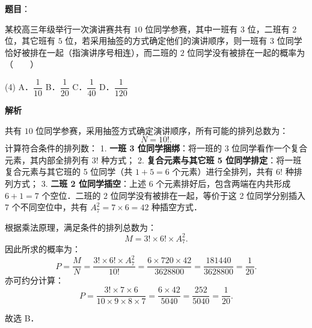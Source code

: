 \begin{answer}

\textbf{题目}：

某校高三年级举行一次演讲赛共有 $10$ 位同学参赛，其中一班有 $3$ 位，二班有 $2$ 位，其它班有 $5$ 位，若采用抽签的方式确定他们的演讲顺序，则一班有 $3$ 位同学恰好被排在一起（指演讲序号相连），而二班的 $2$ 位同学没有被排在一起的概率为\mbox{（　　）}

\begin{gkopts}(4)
\task A．$\dfrac{1}{10}$
\task B．$\dfrac{1}{20}$
\task C．$\dfrac{1}{40}$
\task D．$\dfrac{1}{120}$
\end{gkopts}

\textbf{解析}

共有 $10$ 位同学参赛，采用抽签方式确定演讲顺序，所有可能的排列总数为：
\nopagebreak[4]
\[
N = 10!.
\]
计算符合条件的排列数：
1. \textbf{一班 3 位同学捆绑}：将一班的 3 位同学看作一个复合元素，其内部全排列有 $3!$ 种方式；
2. \textbf{复合元素与其它班 5 位同学排定}：将一班复合元素与其它班的 5 位同学（共 $1 + 5 = 6$ 个元素）进行全排列，共有 $6!$ 种排列方式；
3. \textbf{二班 2 位同学插空}：上述 6 个元素排好后，包含两端在内共形成 $6 + 1 = 7$ 个空位．二班的 2 位同学没有被排在一起，等价于这 2 位同学分别插入 7 个不同空位中，共有 $A_7^2 = 7 \times 6 = 42$ 种插空方式．

根据乘法原理，满足条件的排列总数为：
\nopagebreak[4]
\[
M = 3! \times 6! \times A_7^2.
\]
因此所求的概率为：
\nopagebreak[4]
\[
P = \frac{M}{N} = \frac{3! \times 6! \times A_7^2}{10!} = \frac{6 \times 720 \times 42}{3628800} = \frac{181440}{3628800} = \frac{1}{20}.
\]
亦可约分计算：
\nopagebreak[4]
\[
P = \frac{3! \times 7 \times 6}{10 \times 9 \times 8 \times 7} = \frac{6 \times 42}{5040} = \frac{252}{5040} = \frac{1}{20}.
\]

故选 B．


\end{answer}
